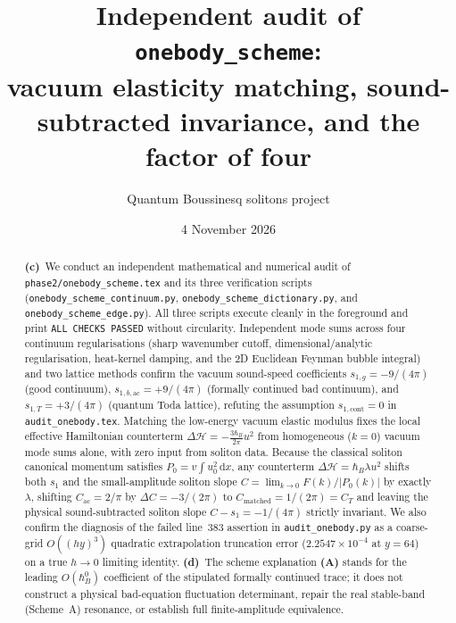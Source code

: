 \documentclass[11pt,a4paper]{article}
\title{Independent audit of \texttt{onebody\_scheme}:\\
vacuum elasticity matching, sound-subtracted invariance, and the factor of four}
\author{Quantum Boussinesq solitons project}
\date{4 November 2026}
\newcommand{\Lc}{\textbf{(c)}\ }
\newcommand{\Ld}{\textbf{(d)}\ }
\newcommand{\dd}{\mathrm d}
\begin{document}
\maketitle

\begin{abstract}
\Lc We conduct an independent mathematical and numerical audit of
\texttt{phase2/\allowbreak onebody\_\allowbreak scheme.tex} and its three verification scripts
(\texttt{onebody\_\allowbreak scheme\_\allowbreak continuum.py},
\texttt{onebody\_\allowbreak scheme\_\allowbreak dictionary.py},
and \texttt{onebody\_\allowbreak scheme\_\allowbreak edge.py}). All three scripts execute cleanly in the
foreground and print \texttt{ALL CHECKS PASSED} without circularity.
Independent mode sums across four continuum regularisations (sharp wavenumber
cutoff, dimensional/analytic regularisation, heat-kernel damping, and the 2D
Euclidean Feynman bubble integral) and two lattice methods confirm the vacuum
sound-speed coefficients $s_{1,g} = -9/(4\pi)$ (good continuum),
$s_{1,b,\mathrm{ac}} = +9/(4\pi)$ (formally continued bad continuum), and
$s_{1,T} = +3/(4\pi)$ (quantum Toda lattice), refuting the assumption
$s_{1,\mathrm{cont}} = 0$ in \texttt{audit\_\allowbreak onebody.tex}.
Matching the low-energy vacuum elastic modulus fixes the local effective
Hamiltonian counterterm $\Delta\mathcal{H} = -\frac{3\hbar_B}{2\pi}u^2$
from homogeneous ($k=0$) vacuum mode sums alone, with zero input from soliton
data. Because the classical soliton canonical momentum satisfies
$P_0 = v\int u_0^2\,\dd x$, any counterterm $\Delta\mathcal{H} = \hbar_B\lambda u^2$
shifts both $s_1$ and the small-amplitude soliton slope
$C = \lim_{k\to 0}F(k)/|P_0(k)|$ by exactly $\lambda$, shifting $C_{\mathrm{ac}} = 2/\pi$
by $\Delta C = -3/(2\pi)$ to $C_{\mathrm{matched}} = 1/(2\pi) = C_T$ and leaving
the physical sound-subtracted soliton slope $C - s_1 = -1/(4\pi)$ strictly invariant.
We also confirm the diagnosis of the failed line~383 assertion in
\texttt{audit\_\allowbreak onebody.py} as a coarse-grid $O((hy)^3)$ quadratic extrapolation
truncation error ($2.2547\times 10^{-4}$ at $y=64$) on a true $h\to 0$ limiting
identity. \Ld The scheme explanation \textbf{(A)} stands for the leading
$O(\hbar_B^0)$ coefficient of the stipulated formally continued trace; it does
not construct a physical bad-equation fluctuation determinant, repair the real
stable-band (Scheme~A) resonance, or establish full finite-amplitude equivalence.
\end{abstract}
\end{document}

